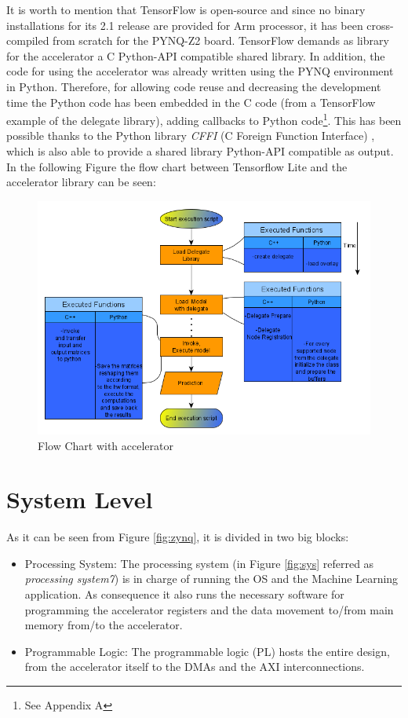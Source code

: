  It is worth to mention that TensorFlow is open-source and since no binary installations for its 2.1 release are provided for Arm processor, it has been cross-compiled from scratch for the PYNQ-Z2 board. 
 \newpage
TensorFlow demands as library for the accelerator a C Python-API compatible shared library. In addition, the code for using the accelerator was already written using the PYNQ environment in Python. Therefore, for allowing code reuse and decreasing the development time the Python code has been embedded in the C code (from a TensorFlow example of the delegate library), adding callbacks to Python code\footnote{See Appendix A}. This has been possible thanks to the Python library \textit{CFFI} (C Foreign Function Interface) \cite{WEBSITE:14}, which is also able to provide a shared library Python-API compatible as output. In the following Figure the flow chart between Tensorflow Lite and the accelerator library can be seen:
\begin{figure}[!htbp]
\centering
\captionsetup{justification=centering}
\includegraphics[scale=0.6]{./figure/flow_chart_accelerator.png}
\caption{Flow Chart with accelerator}
\label{fig:fcaccelerator}
\end{figure}

\newpage
\section{System Level}

As it can be seen from Figure \ref{fig:zynq}, it is divided in two big blocks:
\begin{itemize}
\item Processing System:
The processing system (in Figure \ref{fig:sys} referred as \textit{processing system7}) is in charge of running the OS and the Machine Learning application. As consequence it also runs the necessary software for programming the accelerator registers and the data movement to/from main memory from/to the accelerator.
\item Programmable Logic:
The programmable logic (PL) hosts the entire design, from the accelerator itself to the DMAs and the AXI interconnections.
\end{itemize}

